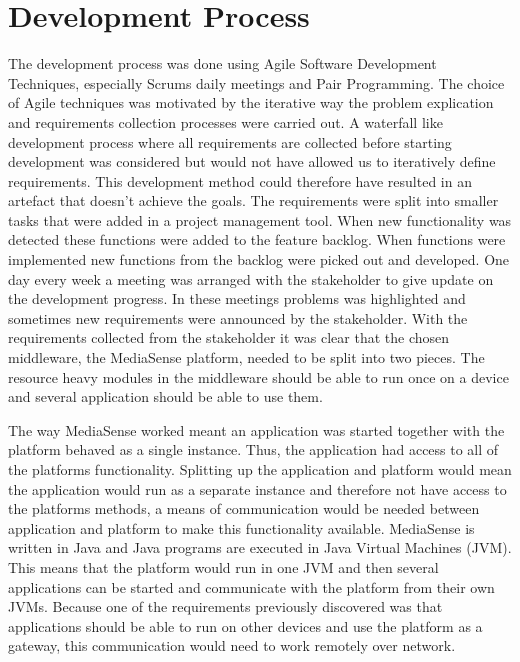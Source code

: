 \section{Development Process}
The development process was done using Agile Software Development Techniques, especially Scrums daily meetings and Pair Programming. The choice of Agile techniques was motivated by the iterative way the problem explication and requirements collection processes were carried out. A waterfall like development process where all requirements are collected before starting development was considered but would not have allowed us to iteratively define requirements. This development method could therefore have resulted in an artefact that doesn't achieve the goals.
The requirements were split into smaller tasks that were added in a project management tool. When new functionality was detected these functions were added to the feature backlog. When functions were implemented new functions from the backlog were picked out and developed. One day every week a meeting was arranged with the stakeholder to give update on the development progress. In these meetings problems was highlighted and sometimes new requirements were announced by the stakeholder. With the requirements collected from the stakeholder it was clear that the chosen middleware, the MediaSense platform, needed to be split into two pieces. The resource heavy modules in the middleware should be able to run once on a device and several application should be able to use them. 

The way MediaSense worked meant an application was started together with the platform behaved as a single instance. Thus, the application had access to all of the platforms functionality. Splitting up the application and platform would mean the application would run as a separate instance and therefore not have access to the platforms methods, a means of communication would be needed between application and platform to make this functionality available. MediaSense is written in Java and Java programs are executed in Java Virtual Machines (JVM). This means that the platform would run in one JVM and then several applications can be started and communicate with the platform from their own JVMs. Because one of the requirements previously discovered was that applications should be able to run on other devices and use the platform as a gateway, this communication would need to work remotely over network.

